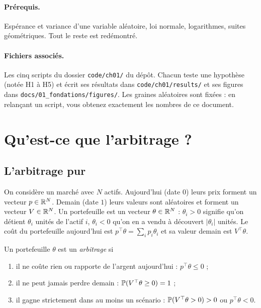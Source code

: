 \documentclass[11pt,a4paper]{article}
\begin{document}
\paragraph{Prérequis.} Espérance et variance d'une variable aléatoire, loi normale, logarithmes, suites géométriques. Tout le reste est redémontré.

\paragraph{Fichiers associés.} Les cinq scripts du dossier \texttt{code/ch01/} du dépôt. Chacun teste une hypothèse (notée H1 à H5) et écrit ses résultats dans \texttt{code/ch01/results/} et ses figures dans \texttt{docs/01\_fondations/figures/}. Les graines aléatoires sont fixées : en relançant un script, vous obtenez exactement les nombres de ce document.

\section{Qu'est-ce que l'arbitrage ?}

\subsection{L'arbitrage pur}

On considère un marché avec $N$ actifs. Aujourd'hui (date $0$) leurs prix forment un vecteur $p \in \mathbb{R}^N$. Demain (date $1$) leurs valeurs sont aléatoires et forment un vecteur $V \in \mathbb{R}^N$. Un portefeuille est un vecteur $\theta \in \mathbb{R}^N$ : $\theta_i > 0$ signifie qu'on détient $\theta_i$ unités de l'actif $i$, $\theta_i < 0$ qu'on en a vendu à découvert $|\theta_i|$ unités. Le coût du portefeuille aujourd'hui est $p^\top\theta = \sum_i p_i\theta_i$ et sa valeur demain est $V^\top\theta$.

\begin{definition}\label{def:arb}
Un portefeuille $\theta$ est un \emph{arbitrage} si
\begin{enumerate}[label=(\roman*)]
\item il ne coûte rien ou rapporte de l'argent aujourd'hui : $p^\top\theta \le 0$ ;
\item il ne peut jamais perdre demain : $\mathbb{P}(V^\top\theta \ge 0) = 1$ ;
\item il gagne strictement dans au moins un scénario : $\mathbb{P}(V^\top\theta > 0) > 0$ ou $p^\top\theta < 0$.
\end{enumerate}
\end{definition}
\end{document}
